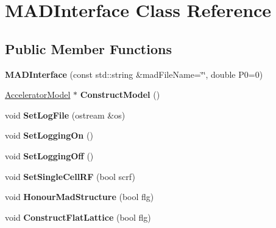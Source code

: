 \hypertarget{classMADInterface}{}\section{M\+A\+D\+Interface Class Reference}
\label{classMADInterface}
\subsection*{Public Member Functions}
\begin{DoxyCompactItemize}
\item 
\mbox{\label{classMADInterface_a83058e0a3e17b68ba952ec3b524dde50}} 
{\bfseries M\+A\+D\+Interface} (const std\+::string \&mad\+File\+Name=\char`\"{}\char`\"{}, double P0=0)
\item 
\mbox{\label{classMADInterface_aa98b0a328ef5966b194ca68a51125879}} 
\hyperlink{classAcceleratorModel}{Accelerator\+Model} $\ast$ {\bfseries Construct\+Model} ()
\item 
\mbox{\label{classMADInterface_a5d3ebaf2fc9e7c0d8e16d7cd8baa3042}} 
void {\bfseries Set\+Log\+File} (ostream \&os)
\item 
\mbox{\label{classMADInterface_ab3b9413e5a8a0587f94c51cb4f9543b7}} 
void {\bfseries Set\+Logging\+On} ()
\item 
\mbox{\label{classMADInterface_a6a0bd36881fcdf534852f170134d2617}} 
void {\bfseries Set\+Logging\+Off} ()
\item 
\mbox{\label{classMADInterface_a03079d581da500028096a54371999c0e}} 
void {\bfseries Set\+Single\+Cell\+RF} (bool scrf)
\item 
\mbox{\label{classMADInterface_ada2648cc56d210d98cde1e5fe688aeec}} 
void {\bfseries Honour\+Mad\+Structure} (bool flg)
\item 
\mbox{\label{classMADInterface_a1b6de40f551ca56bfbcb04eb945e55fc}} 
void {\bfseries Construct\+Flat\+Lattice} (bool flg)
\item 
\mbox{\label{classMADInterface_a42aa6fb84925ebeb8dbc70bccb2b881b}} 

\end{DoxyCompactItemize}
